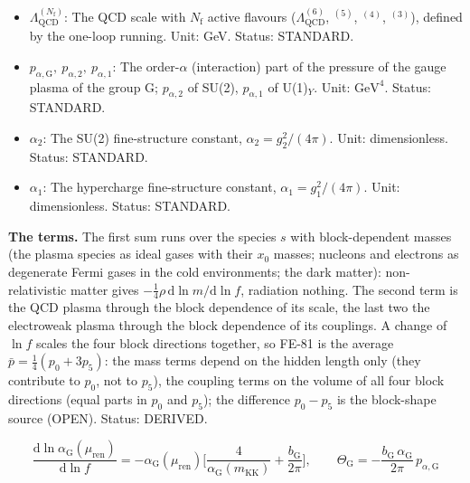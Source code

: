 \documentclass[
  10pt,
]{article}
\begin{document}
\begin{itemize}
  \(\rho - 3p\) of the energy-momentum tensor (interaction measure) of a
  plasma component: \(\Theta_{\mathrm{QCD}}\) of the quark-gluon plasma
  or hadron gas, \(\Theta_{\mathrm{G}}\) of the gauge plasma of the
  group G, \(\Theta_V\) of the thermal gas of the massive vector \(V\)
  (\(\Theta_{\mathrm{W}}\) of \(W^\pm\), \(\Theta_{\mathrm{Z}}\) of
  \(Z\)). Unit: \(\mathrm{GeV}^{4}\). Status: STANDARD.
\item
  \(\Lambda_{\mathrm{QCD}}^{(N_{\mathrm{f}})}\): The QCD scale with
  \(N_{\mathrm{f}}\) active flavours (\(\Lambda_{\mathrm{QCD}}^{(6)}\),
  \(^{(5)}\), \(^{(4)}\), \(^{(3)}\)), defined by the one-loop running.
  Unit: GeV. Status: STANDARD.
\item
  \(p_{\alpha,\mathrm{G}},\ p_{\alpha,2},\ p_{\alpha,1}\): The
  order-\(\alpha\) (interaction) part of the pressure of the gauge
  plasma of the group G; \(p_{\alpha,2}\) of SU(2), \(p_{\alpha,1}\) of
  U(1)\(_Y\). Unit: \(\mathrm{GeV}^{4}\). Status: STANDARD.
\item
  \(\alpha_2\): The SU(2) fine-structure constant,
  \(\alpha_2 = g_2^2/(4\pi)\). Unit: dimensionless. Status: STANDARD.
\item
  \(\alpha_1\): The hypercharge fine-structure constant,
  \(\alpha_1 = g_1^2/(4\pi)\). Unit: dimensionless. Status: STANDARD.
\end{itemize}

\textbf{The terms.} The first sum runs over the species \(s\) with
block-dependent masses (the plasma species as ideal gases with their
\(x_0\) masses; nucleons and electrons as degenerate Fermi gases in the
cold environments; the dark matter): non-relativistic matter gives
\(-\frac14\rho\,\mathrm{d}\ln m/\mathrm{d}\ln f\), radiation nothing.
The second term is the QCD plasma through the block dependence of its
scale, the last two the electroweak plasma through the block dependence
of its couplings. A change of \(\ln f\) scales the four block directions
together, so FE-81 is the average \(\bar p = \frac14(p_0 + 3p_5)\): the
mass terms depend on the hidden length only (they contribute to \(p_0\),
not to \(p_5\)), the coupling terms on the volume of all four block
directions (equal parts in \(p_0\) and \(p_5\)); the difference
\(p_0 - p_5\) is the block-shape source (OPEN). Status: DERIVED.

\[
\frac{\mathrm{d}\ln\alpha_{\mathrm{G}}(\mu_{\mathrm{ren}})}{\mathrm{d}\ln f}
 = -\alpha_{\mathrm{G}}(\mu_{\mathrm{ren}})\Big[\frac{4}{\alpha_{\mathrm{G}}(m_{\mathrm{KK}})} +
 \frac{b_{\mathrm{G}}}{2\pi}\Big],\qquad
\Theta_{\mathrm{G}} = -\frac{b_{\mathrm{G}}\,\alpha_{\mathrm{G}}}{2\pi}\,p_{\alpha,\mathrm{G}} \tag{FE-82}
\]
\end{document}

